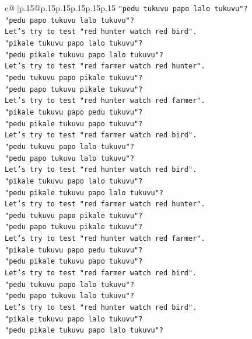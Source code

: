 \documentclass{article}
\begin{document}
{\begin{supertabular}{c@{$\;$}|p{.15\linewidth}@{}p{.15\linewidth}p{.15\linewidth}p{.15\linewidth}p{.15\linewidth}p{.15\linewidth}}
{{{\texttt{"pedu tukuvu papo lalo tukuvu"?} \\
\texttt{"pedu papo tukuvu lalo tukuvu"?} \\
\texttt{Let's try to test "red hunter watch red bird".} \\
\texttt{"pikale tukuvu papo lalo tukuvu"?} \\
\texttt{"pedu pikale tukuvu papo lalo tukuvu"?} \\
\texttt{Let's try to test "red farmer watch red hunter".} \\
\texttt{"pedu tukuvu papo pikale tukuvu"?} \\
\texttt{"pedu papo tukuvu pikale tukuvu"?} \\
\texttt{Let's try to test "red hunter watch red farmer".} \\
\texttt{"pikale tukuvu papo pedu tukuvu"?} \\
\texttt{"pedu pikale tukuvu papo tukuvu"?} \\
\texttt{Let's try to test "red farmer watch red bird".} \\
\texttt{"pedu tukuvu papo lalo tukuvu"?} \\
\texttt{"pedu papo tukuvu lalo tukuvu"?} \\
\texttt{Let's try to test "red hunter watch red bird".} \\
\texttt{"pikale tukuvu papo lalo tukuvu"?} \\
\texttt{"pedu pikale tukuvu papo lalo tukuvu"?} \\
\texttt{Let's try to test "red farmer watch red hunter".} \\
\texttt{"pedu tukuvu papo pikale tukuvu"?} \\
\texttt{"pedu papo tukuvu pikale tukuvu"?} \\
\texttt{Let's try to test "red hunter watch red farmer".} \\
\texttt{"pikale tukuvu papo pedu tukuvu"?} \\
\texttt{"pedu pikale tukuvu papo tukuvu"?} \\
\texttt{Let's try to test "red farmer watch red bird".} \\
\texttt{"pedu tukuvu papo lalo tukuvu"?} \\
\texttt{"pedu papo tukuvu lalo tukuvu"?} \\
\texttt{Let's try to test "red hunter watch red bird".} \\
\texttt{"pikale tukuvu papo lalo tukuvu"?} \\
\texttt{"pedu pikale tukuvu papo lalo tukuvu"?} \\
}}}
\end{supertabular}}
\end{document}
